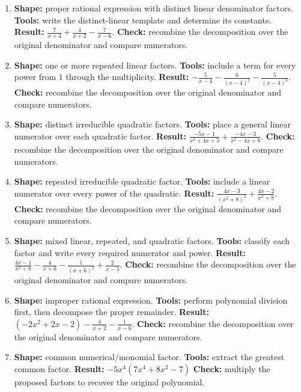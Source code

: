 \documentclass[11pt,oneside]{book}
\begin{document}
\begin{enumerate}[leftmargin=*,label=\textbf{CAP\arabic*.},itemsep=0.45\baselineskip]
\item \textbf{Shape:} proper rational expression with distinct linear denominator factors. \textbf{Tools:} write the distinct-linear template and determine its constants. \textbf{Result:} $\displaystyle \frac{7}{x + 4} + \frac{4}{x + 2} - \frac{7}{x - 6}$. \textbf{Check:} recombine the decomposition over the original denominator and compare numerators.
\item \textbf{Shape:} one or more repeated linear factors. \textbf{Tools:} include a term for every power from $1$ through the multiplicity. \textbf{Result:} $\displaystyle - \frac{5}{x - 4} - \frac{6}{\left(x - 4\right)^{2}} - \frac{5}{\left(x - 4\right)^{3}}$. \textbf{Check:} recombine the decomposition over the original denominator and compare numerators.
\item \textbf{Shape:} distinct irreducible quadratic factors. \textbf{Tools:} place a general linear numerator over each quadratic factor. \textbf{Result:} $\displaystyle \frac{- 5 x - 1}{x^{2} + 4 x + 5} + \frac{- 4 x - 3}{x^{2} - 4 x + 8}$. \textbf{Check:} recombine the decomposition over the original denominator and compare numerators.
\item \textbf{Shape:} repeated irreducible quadratic factor. \textbf{Tools:} include a linear numerator over every power of the quadratic. \textbf{Result:} $\displaystyle \frac{4 x - 3}{\left(x^{2} + 8\right)^{2}} + \frac{4 x - 2}{x^{2} + 8}$. \textbf{Check:} recombine the decomposition over the original denominator and compare numerators.
\item \textbf{Shape:} mixed linear, repeated, and quadratic factors. \textbf{Tools:} classify each factor and write every required numerator and power. \textbf{Result:} $\displaystyle \frac{4 x - 1}{x^{2} + 8} - \frac{4}{x + 6} - \frac{1}{\left(x + 6\right)^{2}} + \frac{2}{x - 5}$. \textbf{Check:} recombine the decomposition over the original denominator and compare numerators.
\item \textbf{Shape:} improper rational expression. \textbf{Tools:} perform polynomial division first, then decompose the proper remainder. \textbf{Result:} $\displaystyle \left(- 2 x^{2} + 2 x - 2\right) - \frac{4}{x + 2} - \frac{1}{x - 6}$. \textbf{Check:} recombine the decomposition over the original denominator and compare numerators.
\item \textbf{Shape:} common numerical/monomial factor. \textbf{Tools:} extract the greatest common factor. \textbf{Result:} $ - 5 x^{4} \left(7 x^{4} + 8 x^{2} - 7\right) $ \textbf{Check:} multiply the proposed factors to recover the original polynomial.

\end{enumerate}
\end{document}
